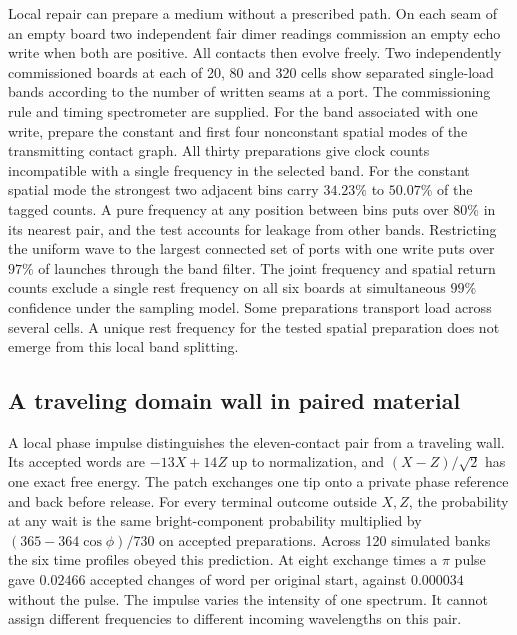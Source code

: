 \documentclass[11pt]{article}
\theoremstyle{definition}
\theoremstyle{remark}
\theoremstyle{plain}
\begin{document}
Local repair can prepare a medium without a prescribed path. On each
seam of an empty board two independent fair dimer readings commission
an empty echo write when both are positive. All contacts then evolve
freely. Two independently commissioned boards at each of 20, 80 and
320 cells show separated single-load bands according to the number
of written seams at a port. The commissioning rule and timing
spectrometer are supplied. For the band associated with one write,
prepare the constant and first four nonconstant spatial modes of the
transmitting contact graph. All thirty preparations give clock counts
incompatible with a single frequency in the selected band. For the
constant spatial mode the strongest two adjacent bins carry
$34.23\%$ to $50.07\%$ of the tagged counts. A pure frequency at any
position between bins puts over $80\%$ in its nearest pair, and the
test accounts for leakage from other bands. Restricting the uniform wave
to the largest connected set of ports with one write puts over $97\%$
of launches through the band filter. The joint frequency and spatial
return counts exclude a single rest frequency on all six boards
at simultaneous $99\%$ confidence under the sampling model. Some
preparations transport load across several cells. A unique rest frequency for the
tested spatial preparation does not emerge from this local band splitting.

\subsection{A traveling domain wall in paired material}
\label{sec:collective-wall}

A local phase impulse distinguishes the eleven-contact pair from a
traveling wall. Its accepted words are $-13X+14Z$ up to normalization,
and $(X-Z)/\sqrt{2}$ has one exact free energy. The patch exchanges
one tip onto a private phase reference and back before release.
For every terminal outcome outside $X,Z$, the probability at any wait is
the same bright-component probability multiplied by
$(365-364\cos\phi)/730$ on accepted preparations. Across 120 simulated
banks the six time profiles obeyed this prediction. At eight exchange
times a $\pi$ pulse gave $0.02466$ accepted changes of word per original
start, against $0.000034$ without the pulse. The impulse varies the
intensity of one spectrum. It cannot assign different frequencies to
different incoming wavelengths on this pair.
\end{document}
